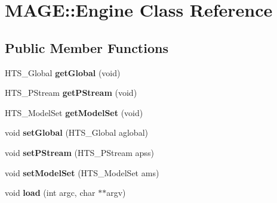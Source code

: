 \hypertarget{class_m_a_g_e_1_1_engine}{\section{M\-A\-G\-E\-:\-:Engine Class Reference}
\label{class_m_a_g_e_1_1_engine}
}
\subsection*{Public Member Functions}
\begin{DoxyCompactItemize}
\item 
\hypertarget{class_m_a_g_e_1_1_engine_a7f5524bb3e6f55c6ee496fcd86923ca8}{H\-T\-S\-\_\-\-Global {\bfseries get\-Global} (void)}\label{class_m_a_g_e_1_1_engine_a7f5524bb3e6f55c6ee496fcd86923ca8}

\item 
\hypertarget{class_m_a_g_e_1_1_engine_acaab046109c999aa884245e5e8dd613a}{H\-T\-S\-\_\-\-P\-Stream {\bfseries get\-P\-Stream} (void)}\label{class_m_a_g_e_1_1_engine_acaab046109c999aa884245e5e8dd613a}

\item 
\hypertarget{class_m_a_g_e_1_1_engine_aaafb8884aeb03edb88f7b61f358a74ea}{H\-T\-S\-\_\-\-Model\-Set {\bfseries get\-Model\-Set} (void)}\label{class_m_a_g_e_1_1_engine_aaafb8884aeb03edb88f7b61f358a74ea}

\item 
\hypertarget{class_m_a_g_e_1_1_engine_a5a0940ccfcd254f4e26e1e4f7bac4352}{void {\bfseries set\-Global} (H\-T\-S\-\_\-\-Global aglobal)}\label{class_m_a_g_e_1_1_engine_a5a0940ccfcd254f4e26e1e4f7bac4352}

\item 
\hypertarget{class_m_a_g_e_1_1_engine_a6d9578d3142bd223e4f9a16b85c345ad}{void {\bfseries set\-P\-Stream} (H\-T\-S\-\_\-\-P\-Stream apss)}\label{class_m_a_g_e_1_1_engine_a6d9578d3142bd223e4f9a16b85c345ad}

\item 
\hypertarget{class_m_a_g_e_1_1_engine_a2c560516aed6235a6e97787581d20ab1}{void {\bfseries set\-Model\-Set} (H\-T\-S\-\_\-\-Model\-Set ams)}\label{class_m_a_g_e_1_1_engine_a2c560516aed6235a6e97787581d20ab1}

\item 
\hypertarget{class_m_a_g_e_1_1_engine_a06011d5cf59c57d195b47b03d37b5206}{void {\bfseries load} (int argc, char $\ast$$\ast$argv)}\label{class_m_a_g_e_1_1_engine_a06011d5cf59c57d195b47b03d37b5206}

\end{DoxyCompactItemize}
